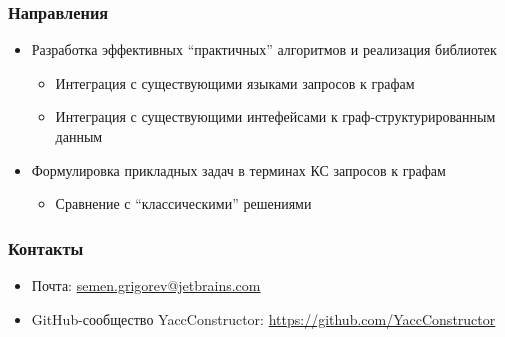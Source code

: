 \documentclass[xcolor=table,aspectratio=169]{beamer}
\begin{document}
\begin{frame}
  \transwipe[direction=90]
  \frametitle{Направления}

\begin{itemize} 
\item Разработка эффективных ``практичных'' алгоритмов и реализация библиотек
\begin{itemize} 
\item Интеграция с существующими языками запросов к графам
\item Интеграция с существующими интефейсами к граф-структурированным данным
\end{itemize}

\item Формулировка прикладных задач в терминах КС запросов к графам
\begin{itemize} 
\item Сравнение с ``классическими'' решениями
\end{itemize}

\end{itemize}

\end{frame}

            
\begin{frame}
\transwipe[direction=90]
\frametitle{Контакты}
\begin{itemize}
  \item Почта: \url{semen.grigorev@jetbrains.com}
  \item GitHub-сообщество YaccConstructor: \url{https://github.com/YaccConstructor}
\end{itemize}
\end{frame}
\end{document}
